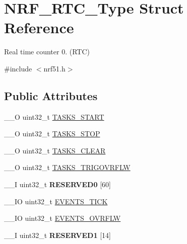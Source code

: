 \hypertarget{struct_n_r_f___r_t_c___type}{}\section{N\+R\+F\+\_\+\+R\+T\+C\+\_\+\+Type Struct Reference}
\label{struct_n_r_f___r_t_c___type}


Real time counter 0. (R\+T\+C)  




{\ttfamily \#include $<$nrf51.\+h$>$}

\subsection*{Public Attributes}
\begin{DoxyCompactItemize}
\item 
\+\_\+\+\_\+\+O uint32\+\_\+t \hyperlink{struct_n_r_f___r_t_c___type_a11a53ca482889bb4a02586e1dd426b4b}{T\+A\+S\+K\+S\+\_\+\+S\+T\+A\+R\+T}
\item 
\+\_\+\+\_\+\+O uint32\+\_\+t \hyperlink{struct_n_r_f___r_t_c___type_a6c251ab88a855ba8c0b8ab21928b0cb2}{T\+A\+S\+K\+S\+\_\+\+S\+T\+O\+P}
\item 
\+\_\+\+\_\+\+O uint32\+\_\+t \hyperlink{struct_n_r_f___r_t_c___type_a1636440e953af7d457080dabf0345556}{T\+A\+S\+K\+S\+\_\+\+C\+L\+E\+A\+R}
\item 
\+\_\+\+\_\+\+O uint32\+\_\+t \hyperlink{struct_n_r_f___r_t_c___type_a08d8aef4b68b48e7ee8be18cbfc19665}{T\+A\+S\+K\+S\+\_\+\+T\+R\+I\+G\+O\+V\+R\+F\+L\+W}
\item 
\hypertarget{struct_n_r_f___r_t_c___type_a3b423abb24ab0ebdaf8910586ff204b5}{}\+\_\+\+\_\+\+I uint32\+\_\+t {\bfseries R\+E\+S\+E\+R\+V\+E\+D0} \mbox{[}60\mbox{]}\label{struct_n_r_f___r_t_c___type_a3b423abb24ab0ebdaf8910586ff204b5}

\item 
\+\_\+\+\_\+\+I\+O uint32\+\_\+t \hyperlink{struct_n_r_f___r_t_c___type_a7985f71934d1a09b39e079258650dfd0}{E\+V\+E\+N\+T\+S\+\_\+\+T\+I\+C\+K}
\item 
\+\_\+\+\_\+\+I\+O uint32\+\_\+t \hyperlink{struct_n_r_f___r_t_c___type_a9e5b1a1a095bceb148a1d3e5db27c3e0}{E\+V\+E\+N\+T\+S\+\_\+\+O\+V\+R\+F\+L\+W}
\item 
\hypertarget{struct_n_r_f___r_t_c___type_aa1f50210a182db1a7b68ef1485c39394}{}\+\_\+\+\_\+\+I uint32\+\_\+t {\bfseries R\+E\+S\+E\+R\+V\+E\+D1} \mbox{[}14\mbox{]}\label{struct_n_r_f___r_t_c___type_aa1f50210a182db1a7b68ef1485c39394}


\end{DoxyCompactItemize}

